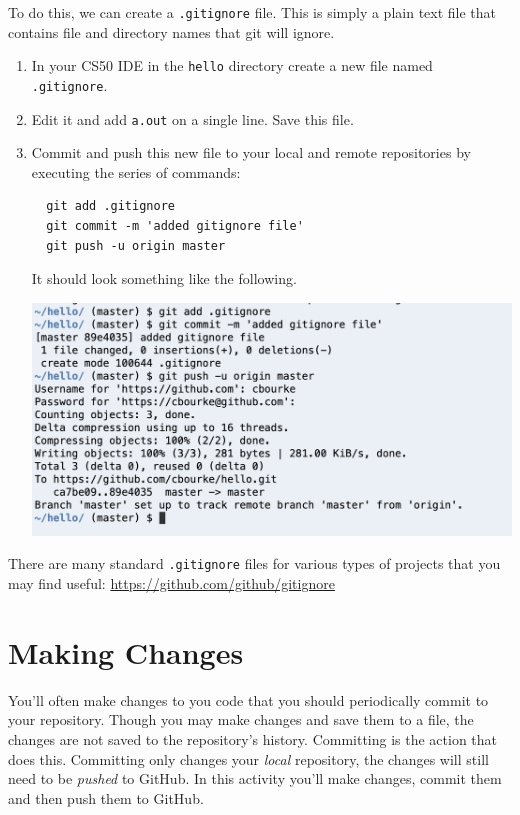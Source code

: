 \documentclass[12pt]{scrartcl}
\begin{document}
To do this, we can create a \texttt{.gitignore} file.  This
is simply a plain text file that contains file and directory names 
that git will ignore.  

\begin{enumerate}
  \item In your CS50 IDE in the \texttt{hello} directory
  create a new file named \texttt{.gitignore}.  

  \item Edit it and add \texttt{a.out} on a single line.
  Save this file.
  
  \item Commit and push this new file to your local and remote
  repositories by executing the series of commands:
  
  \begin{verbatim}
  git add .gitignore
  git commit -m 'added gitignore file'
  git push -u origin master
  \end{verbatim}
  
  It should look something like the following.
  
  \begin{center}
  \includegraphics[scale=0.50]{./hack1.0-files/cl-gitignore}
  \end{center}
  
\end{enumerate}

There are many standard \texttt{.gitignore} files for
various types of projects that you may find useful: 
\url{https://github.com/github/gitignore}

\section{Making Changes}

You'll often make changes to you code that you should periodically
commit to your repository.  Though you may make changes and save them to a file, 
the changes are not saved to the repository's history.  Committing is 
the action that does this.  Committing only changes your \emph{local}
repository, the changes will still need to be \emph{pushed} to GitHub.
In this activity you'll make changes, commit them and then push them
to GitHub.
\end{document}
